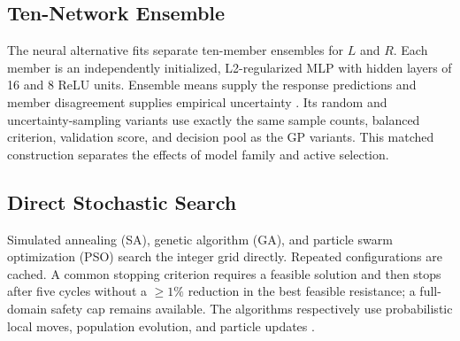 \documentclass[conference]{IEEEtran}
\begin{document}
\subsection{Ten-Network Ensemble}
The neural alternative fits separate ten-member ensembles for $L$ and $R$. Each member is an independently initialized, L2-regularized MLP with hidden layers of 16 and 8 ReLU units. Ensemble means supply the response predictions and member disagreement supplies empirical uncertainty \cite{lakshminarayanan}. Its random and uncertainty-sampling variants use exactly the same sample counts, balanced criterion, validation score, and decision pool as the GP variants. This matched construction separates the effects of model family and active selection.

\subsection{Direct Stochastic Search}
Simulated annealing (SA), genetic algorithm (GA), and particle swarm optimization (PSO) search the integer grid directly. Repeated configurations are cached. A common stopping criterion requires a feasible solution and then stops after five cycles without a $\geq1\%$ reduction in the best feasible resistance; a full-domain safety cap remains available. The algorithms respectively use probabilistic local moves, population evolution, and particle updates \cite{kirkpatrick,holland,kennedy}.
\end{document}
